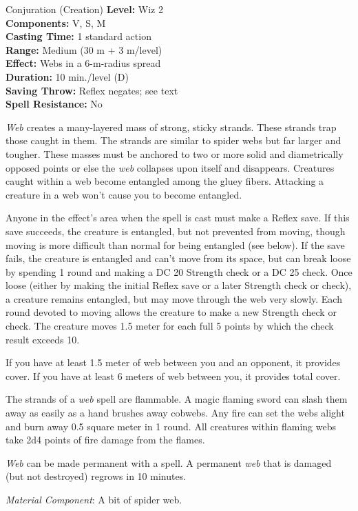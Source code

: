{Conjuration (Creation)}
{
	\textbf{Level:}
	Wiz 2\\
	\textbf{Components:}
	V, S, M\\
	\textbf{Casting Time:}
	1 standard action\\
	\textbf{Range:}
	Medium (30 m + 3 m/level)\\
	\textbf{Effect:}
	Webs in a 6-m-radius spread\\
	\textbf{Duration:}
	10 min./level (D)\\
	\textbf{Saving Throw:}
	Reflex negates; see text\\
	\textbf{Spell Resistance:}
	No\\
}
{
	\emph{Web} creates a many-layered mass of strong, sticky strands. These strands trap those caught in them. The strands are similar to spider webs but far larger and tougher. These masses must be anchored to two or more solid and diametrically opposed points or else the \emph{web} collapses upon itself and disappears. Creatures caught within a web become entangled among the gluey fibers. Attacking a creature in a web won't cause you to become entangled.

	Anyone in the effect's area when the spell is cast must make a Reflex save. If this save succeeds, the creature is entangled, but not prevented from moving, though moving is more difficult than normal for being entangled (see below). If the save fails, the creature is entangled and can't move from its space, but can break loose by spending 1 round and making a DC 20 Strength check or a DC 25  check. Once loose (either by making the initial Reflex save or a later Strength check or  check), a creature remains entangled, but may move through the web very slowly. Each round devoted to moving allows the creature to make a new Strength check or  check. The creature moves 1.5 meter for each full 5 points by which the check result exceeds 10.

	If you have at least 1.5 meter of web between you and an opponent, it provides cover. If you have at least 6 meters of web between you, it provides total cover.

	The strands of a \emph{web} spell are flammable. A magic flaming sword can slash them away as easily as a hand brushes away cobwebs. Any fire can set the webs alight and burn away 0.5 square meter in 1 round. All creatures within flaming webs take 2d4 points of fire damage from the flames.

	\emph{Web} can be made permanent with a  spell. A permanent \emph{web} that is damaged (but not destroyed) regrows in 10 minutes.

	\textit{Material Component}:
	A bit of spider web.

}
